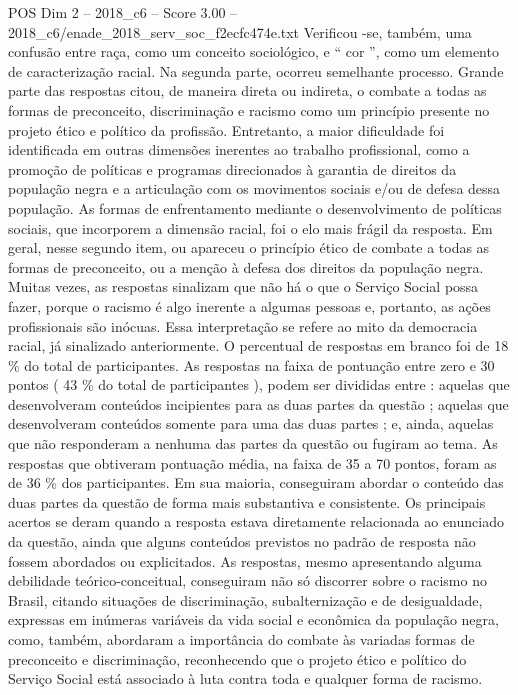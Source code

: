 \begin{textsample}{POS Dim 2 – 2018\_c6 – Score 3.00 – 2018\_c6/enade\_2018\_serv\_soc\_f2ecfc474e.txt}
Verificou -se, também, uma confusão entre raça, como um conceito sociológico, e “ cor ”, como um elemento de caracterização racial.
Na segunda parte, ocorreu semelhante processo.
Grande parte das respostas citou, de maneira direta ou indireta, o combate a todas as formas de preconceito, discriminação e racismo como um princípio presente no projeto ético e político da profissão.
Entretanto, a maior dificuldade foi identificada em outras dimensões inerentes ao trabalho profissional, como a promoção de políticas e programas direcionados à garantia de direitos da população negra e a articulação com os movimentos sociais e/ou de defesa dessa população.
As formas de enfrentamento mediante o desenvolvimento de políticas sociais, que incorporem a dimensão racial, foi o elo mais frágil da resposta.
Em geral, nesse segundo item, ou apareceu o princípio ético de combate a todas as formas de preconceito, ou a menção à defesa dos direitos da população negra.
Muitas vezes, as respostas sinalizam que não há o que o Serviço Social possa fazer, porque o racismo é algo inerente a algumas pessoas e, portanto, as ações profissionais são inócuas.
Essa interpretação se refere ao mito da democracia racial, já sinalizado anteriormente.
O percentual de respostas em branco foi de 18 \% do total de participantes.
As respostas na faixa de pontuação entre zero e 30 pontos ( 43 \% do total de participantes ), podem ser divididas entre : aquelas que desenvolveram conteúdos incipientes para as duas partes da questão ; aquelas que desenvolveram conteúdos somente para uma das duas partes ; e, ainda, aquelas que não responderam a nenhuma das partes da questão ou fugiram ao tema.
As respostas que obtiveram pontuação média, na faixa de 35 a 70 pontos, foram as de 36 \% dos participantes.
Em sua maioria, conseguiram abordar o conteúdo das duas partes da questão de forma mais substantiva e consistente.
Os principais acertos se deram quando a resposta estava diretamente relacionada ao enunciado da questão, ainda que alguns conteúdos previstos no padrão de resposta não fossem abordados ou explicitados.
As respostas, mesmo apresentando alguma debilidade teórico-conceitual, conseguiram não só discorrer sobre o racismo no Brasil, citando situações de discriminação, subalternização e de desigualdade, expressas em inúmeras variáveis da vida social e econômica da população negra, como, também, abordaram a importância do combate às variadas formas de preconceito e discriminação, reconhecendo que o projeto ético e político do Serviço Social está associado à luta contra toda e qualquer forma de racismo.

\end{textsample}
